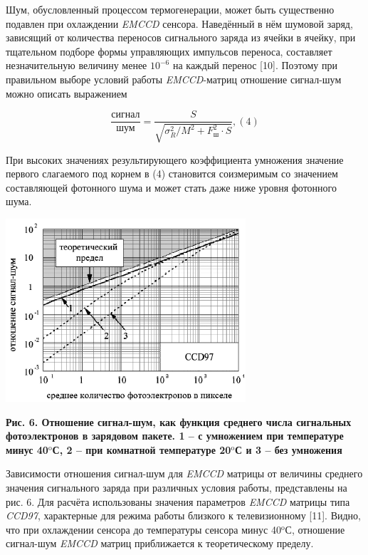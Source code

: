 \documentclass[11pt]{article}
\begin{document}
Шум, обусловленный процессом термогенерации, может быть существенно подавлен при охлаждении \textit{EMCCD} сенсора. Наведённый в нём шумовой заряд, зависящий от количества переносов сигнального заряда из ячейки в ячейку, при тщательном подборе формы управляющих импульсов переноса, составляет незначительную величину менее $10^{-6}$ на каждый перенос [10]. Поэтому при правильном выборе условий работы \textit{EMCCD}-матриц отношение сигнал-шум можно описать выражением

$$\frac{\text{сигнал}}{\text{шум}} = \frac{S}{\sqrt{\sigma_R^2/M^2+F_{\textit{ш}}^2\cdot S}}, (4)$$

При высоких значениях результирующего коэффициента умножения значение
первого слагаемого под корнем в (4) становится соизмеримым со значением составляющей фотонного шума и может стать даже ниже уровня фотонного шума.

\includegraphics[width=0.8\linewidth]{10.png}
\begin{center}
\textbf{Рис. 6. Отношение сигнал-шум, как функция среднего числа сигнальных
фотоэлектронов в зарядовом пакете. 1 – с умножением при температуре минус 40$^{\text{o}}$С, 2 – при комнатной температуре 20$^{\text{o}}$С и 3 – без умножения}
\end{center}

Зависимости отношения сигнал-шум для \textit{EMCCD} матрицы от величины среднего значения сигнального заряда при различных условия работы, представлены на рис. 6. Для расчёта использованы значения параметров \textit{EMCCD} матрицы типа \textit{CCD97}, характерные для режима работы близкого к телевизионному [11]. Видно, что при охлаждении сенсора до температуры сенсора минус 40$^{\text{o}}$С, отношение сигнал-шум \textit{EMCCD} матриц приближается к теоретическому пределу.
\end{document}
